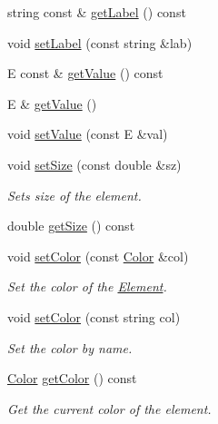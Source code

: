 \begin{DoxyCompactItemize}
string const  \& \mbox{\hyperlink{classbridges_1_1datastructure_1_1_element_a44949edf79379a4d48490e98c15992a6}{get\+Label}} () const
\item 
void \mbox{\hyperlink{classbridges_1_1datastructure_1_1_element_a3a1fe4e3aa100125710c30f6e401e8c3}{set\+Label}} (const string \&lab)
\item 
E const  \& \mbox{\hyperlink{classbridges_1_1datastructure_1_1_element_acf6e068c6b00ff0d20ed42af32ff1f38}{get\+Value}} () const
\item 
E \& \mbox{\hyperlink{classbridges_1_1datastructure_1_1_element_abba0b4c03eb6fd08aed17eeb3be5bd1b}{get\+Value}} ()
\item 
void \mbox{\hyperlink{classbridges_1_1datastructure_1_1_element_a26f2aceb9eed7195fd55b3538f3c059f}{set\+Value}} (const E \&val)
\item 
void \mbox{\hyperlink{classbridges_1_1datastructure_1_1_element_a3200b0ac712c1720db62d1f0bbcb14be}{set\+Size}} (const double \&sz)
\begin{DoxyCompactList}\small\item\em Sets size of the element. \end{DoxyCompactList}\item 
double \mbox{\hyperlink{classbridges_1_1datastructure_1_1_element_a8c0b15450978b03c8ebf6a3c23092cba}{get\+Size}} () const
\item 
void \mbox{\hyperlink{classbridges_1_1datastructure_1_1_element_a17d75aae50a48b3404f3c6811c62ae1c}{set\+Color}} (const \mbox{\hyperlink{classbridges_1_1datastructure_1_1_color}{Color}} \&col)
\begin{DoxyCompactList}\small\item\em Set the color of the \mbox{\hyperlink{classbridges_1_1datastructure_1_1_element}{Element}}. \end{DoxyCompactList}\item 
void \mbox{\hyperlink{classbridges_1_1datastructure_1_1_element_a3792c8d514f4d644d739c6124f26bcbf}{set\+Color}} (const string col)
\begin{DoxyCompactList}\small\item\em Set the color by name. \end{DoxyCompactList}\item 
\mbox{\hyperlink{classbridges_1_1datastructure_1_1_color}{Color}} \mbox{\hyperlink{classbridges_1_1datastructure_1_1_element_adf441bce0ef9e4abd36c1df00ea5932c}{get\+Color}} () const
\begin{DoxyCompactList}\small\item\em Get the current color of the element. \end{DoxyCompactList}\item 

\end{DoxyCompactItemize}
